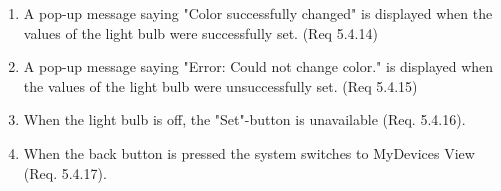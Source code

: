 \documentclass[a4paper]{article}
\newlength{\testlabellength}
\newenvironment{testlist}{\begin{enumerate}[label=\bfseries Instruction \thesubsection.\arabic* , labelindent=0pt, labelwidth=\testlabellength , leftmargin=2cm]}{\end{enumerate}}
\newenvironment{precondition}{
{\color{white}BLARG}\\ 
\textbf{Precondition}
\begin{itemize}[labelindent=0cm, labelwidth=2cm , leftmargin=1cm]
}
{\end{itemize}}
\newenvironment{instruction}{
\textbf{Instructions:}
\begin{enumerate}[label=\bfseries  \arabic*., labelindent=0cm, labelwidth=2cm , leftmargin=1cm]
}
{\end{enumerate}}
\newenvironment{postcondition}{
\textbf{Postcondition:}
\begin{itemize}[labelindent=0cm, labelwidth=2cm , leftmargin=1cm]
}
{\end{itemize}}
\begin{document}
\begin{appendices}
\begin{testlist}
    \item A pop-up message saying "Color successfully changed" is displayed when the values of the light bulb were successfully set. (Req 5.4.14)

    \item A pop-up message saying "Error: Could not change color." is displayed when the values of the light bulb were unsuccessfully set. (Req 5.4.15)

    \item When the light bulb is off, the "Set"-button is unavailable (Req. 5.4.16).

    \item When the back button is pressed the system switches to MyDevices View (Req. 5.4.17).
    

\end{testlist}
\end{appendices}
\end{document}
